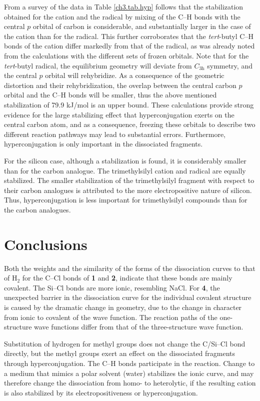 From a survey of the data in Table \ref{ch3.tab.hyp} follows that the stabilization obtained for the cation and the radical by mixing of the C--H bonds with the central $p$ orbital of carbon is considerable, and substantially larger in the case of the cation than for the radical.  This further corroborates that the \textit{tert}-butyl C--H bonds of the cation differ markedly from that of the radical, as was already noted from the calculations with the different sets of frozen orbitals.  Note that for the \textit{tert}-butyl radical, the equilibrium geometry will deviate from $C_\mathrm{3h}$ symmetry, and the central $p$ orbital will rehybridize.  As a consequence of the geometric distortion and their rehybridization, the overlap between the central carbon $p$ orbital and the C--H bonds will be smaller, thus the above mentioned stabilization of 79.9 kJ/mol is an upper bound.  These calculations provide strong evidence for the large stabilizing effect that hyperconjugation exerts on the central carbon atom, and as a consequence, freezing these orbitals to describe two different reaction pathways may lead to substantial errors.  Furthermore, hyperconjugation is only important in the dissociated fragments.

For the silicon case, although a stabilization is found, it is considerably smaller than for the carbon analogue.  The trimethylsilyl cation and radical are equally stabilized.  The smaller stabilization of the trimethylsilyl fragment with respect to their carbon analogues is attributed to the more electropositive nature of silicon. Thus, hyperconjugation is less important for trimethylsilyl compounds than for the carbon analogues.

\section{Conclusions}

Both the weights and the similarity of the forms of the dissociation curves to that of H$_2$ for the C--Cl bonds of \textbf{1} and \textbf{2}, indicate that these bonds are mainly covalent.  The Si--Cl bonds are more ionic, resembling NaCl.  For \textbf{4}, the unexpected barrier in the dissociation curve for the individual covalent structure is caused by the dramatic change in geometry, due to the change in character from ionic to covalent of the wave function.  The reaction paths of the one-structure wave functions differ from that of the three-structure wave function.

Substitution of hydrogen for methyl groups does not change the C/Si--Cl bond directly, but the methyl groups exert an effect on the dissociated fragments through hyperconjugation.  The C--H bonds participate in the reaction.  Change to a medium that mimics a polar solvent (water) stabilizes the ionic curve, and may therefore change the dissociation from homo- to heterolytic, if the resulting cation is also stabilized by its electropositiveness or hyperconjugation.
 
